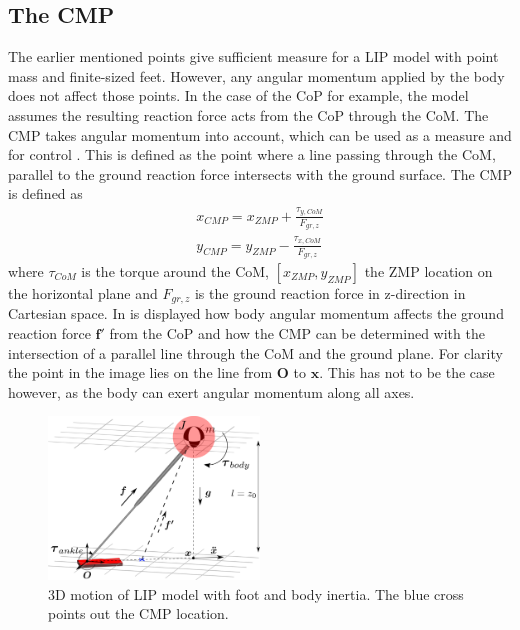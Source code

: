 \subsection{The \ac{CMP}}
The earlier mentioned points give sufficient measure for a \ac{LIP} model with point mass and finite-sized feet. However, any angular momentum applied by the body does not affect those points. In the case of the \ac{CoP} for example, the model assumes the resulting reaction force acts from the \ac{CoP} through the \ac{CoM}. The \ac{CMP} takes angular momentum into account, which can be used as a measure and for control \cite{popovic2005ground}. This is defined as the point where a line passing through the \ac{CoM}, parallel to the ground reaction force intersects with the ground surface. The \ac{CMP} is defined as
\begin{eqnarray}
x_{CMP} = x_{ZMP} + \frac{\tau_{y,CoM}}{F_{gr,z}}\\
y_{CMP} = y_{ZMP} - \frac{\tau_{x,CoM}}{F_{gr,z}}
\end{eqnarray}
where $\tau_{CoM}$ is the torque around the \ac{CoM}, $[x_{ZMP},y_{ZMP}]$ the \ac{ZMP} location on the horizontal plane and $F_{gr,z}$ is the ground reaction force in z-direction in Cartesian space. In  is displayed how body angular momentum affects the ground reaction force $\boldsymbol{f'}$ from the \ac{CoP} and how the \ac{CMP} can be determined with the intersection of a parallel line through the \ac{CoM} and the ground plane. For clarity the point in the image lies on the line from $\boldsymbol{O}$ to $\boldsymbol{x}$. This has not to be the case however, as the body can exert angular momentum along all axes. 
\begin{figure}[h]
\centering
\includegraphics[width=0.5\textwidth]{STYLESTUFF/3DCoMwithfootinertia.png}
\caption{\ac{3D} motion of \ac{LIP} model with foot and body inertia. The blue cross points out the \ac{CMP} location.}
\label{fig:3dlipfootinertia}
\end{figure}







